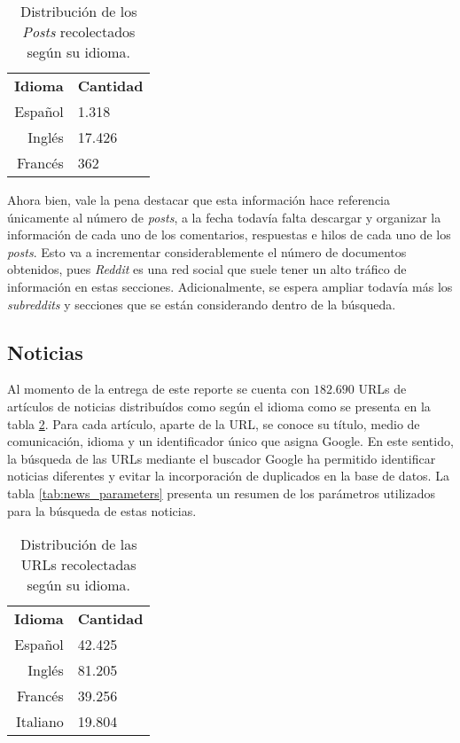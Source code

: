 \begin{table}[h]
    \centering
    \begin{tabular}{r|l}
        \textbf{Idioma} & \textbf{Cantidad} \\
        Español & 1.318 \\
        Inglés & 17.426 \\
        Francés & 362 \\
    \end{tabular}
    \caption{Distribución de los \textit{Posts} recolectados según su idioma.}
    \label{tab:reddit_results}
\end{table}

Ahora bien, vale la pena destacar que esta información hace referencia únicamente al número de \textit{posts}, a la fecha todavía falta descargar y organizar la información de cada uno de los comentarios, respuestas e hilos de cada uno de los \textit{posts}. Esto va a incrementar considerablemente el número de documentos obtenidos, pues \textit{Reddit} es una red social que suele tener un alto tráfico de información en estas secciones. Adicionalmente, se espera ampliar todavía más los \textit{subreddits} y secciones que se están considerando dentro de la búsqueda.

\subsection{Noticias}
Al momento de la entrega de este reporte se cuenta con $182.690$ URLs de artículos de noticias distribuídos como según el idioma como se presenta en la tabla \ref{tab:news_results}. Para cada artículo, aparte de la URL, se conoce su título, medio de comunicación, idioma y un identificador único que asigna Google. En este sentido, la búsqueda de las URLs mediante el buscador Google ha permitido identificar noticias diferentes y evitar la incorporación de duplicados en la base de datos. La tabla \ref{tab:news_parameters} presenta un resumen de los parámetros utilizados para la búsqueda de estas noticias. \\

\begin{table}[H]
    \centering
    \begin{tabular}{r|l}
        \textbf{Idioma} & \textbf{Cantidad} \\
        Español & 42.425 \\
        Inglés & 81.205 \\
        Francés & 39.256 \\
        Italiano & 19.804
    \end{tabular}
    \caption{Distribución de las URLs recolectadas según su idioma.}
    \label{tab:news_results}
\end{table}

